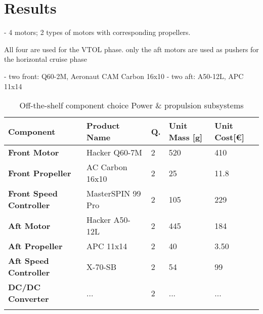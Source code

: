 \section{Results}
\label{sec:RPNP}

- 4 motors; 2 types of motors with corresponding propellers.

All four are used for the VTOL phase. only  the aft motors are used as pushers for the horizontal cruise phase

- two front: Q60-2M, Aeronaut CAM Carbon 16x10
- two aft: A50-12L, APC 11x14



\begin{table}[H]
\centering
\caption{Off-the-shelf component choice Power \& propulsion subsystems}
\label{PNPresults}
    \begin{tabular}{m{3cm}m{3.2cm}m{0.6cm}m{2.64cm}m{2.64cm}}
    \toprule
    \textbf{Component}                   & \textbf{Product Name}                                                     & \textbf{Q.} & \textbf{Unit Mass {[g]}} & \textbf{Unit Cost{[\euro]}} \\ \midrule
    \textbf{Front Motor}        & Hacker Q60-7M                                                             & 2           & 520                        & 410                      \\\hdashline
    \textbf{Front Propeller}    & AC Carbon 16x10                                                           & 2           & 25                         & 11.8                      \\\hdashline
    \textbf{Front Speed Controller} & MasterSPIN 99 Pro                                                         & 2           & 105                        & 229                      \\\hdashline
    \textbf{Aft Motor}          & Hacker A50-12L                                                            & 2           & 445                        & 184                      \\\hdashline
    \textbf{Aft Propeller}      & APC 11x14                                                                 & 2           & 40                         & 3.50                       \\\hdashline
    \textbf{Aft Speed Controller}   & X-70-SB                                                                   & 2           & 54                         & 99                       \\\hdashline
    \textbf{DC/DC Converter}    & ...                                                                       & 2           & ...                        & ...                        \\\hdashline

\end{tabular}
\end{table}
